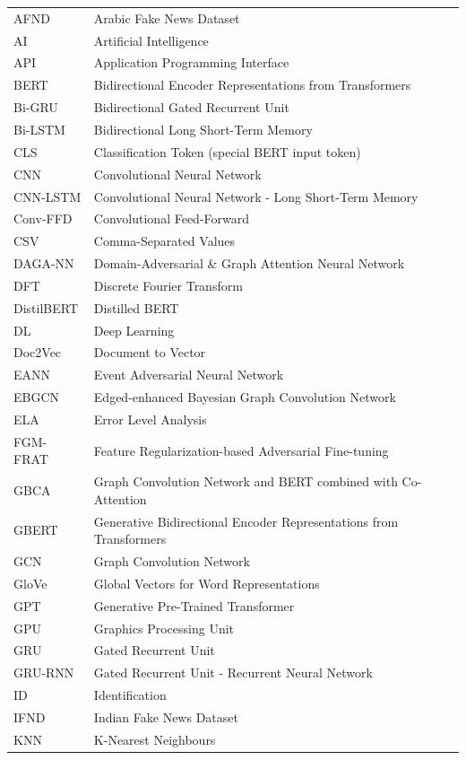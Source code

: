 \documentclass[stu,12pt,floatsintext,donotrepeattitle]{apa7}
\begin{document}
\begin{longtable}{p{3cm} p{10cm}}
AFND & Arabic Fake News Dataset \\
AI & Artificial Intelligence \\
API & Application Programming Interface \\
BERT & Bidirectional Encoder Representations from Transformers \\
Bi-GRU & Bidirectional Gated Recurrent Unit \\
Bi-LSTM & Bidirectional Long Short-Term Memory \\
CLS & Classification Token (special BERT input token) \\
CNN & Convolutional Neural Network \\
CNN-LSTM & Convolutional Neural Network - Long Short-Term Memory \\
Conv-FFD & Convolutional Feed-Forward \\
CSV & Comma-Separated Values \\
DAGA-NN & Domain-Adversarial \& Graph Attention Neural Network \\
DFT & Discrete Fourier Transform \\
DistilBERT & Distilled BERT \\
DL & Deep Learning \\
Doc2Vec & Document to Vector \\
EANN & Event Adversarial Neural Network \\
EBGCN & Edged-enhanced Bayesian Graph Convolution Network \\
ELA & Error Level Analysis \\
FGM-FRAT & Feature Regularization-based Adversarial Fine-tuning \\
GBCA & Graph Convolution Network and BERT combined with Co-Attention \\
GBERT & Generative Bidirectional Encoder Representations from Transformers \\
GCN & Graph Convolution Network \\
GloVe & Global Vectors for Word Representations \\
GPT & Generative Pre-Trained Transformer \\
GPU & Graphics Processing Unit \\
GRU & Gated Recurrent Unit \\
GRU-RNN & Gated Recurrent Unit - Recurrent Neural Network \\
ID & Identification \\
IFND & Indian Fake News Dataset \\
KNN & K-Nearest Neighbours \\

\end{longtable}
\end{document}
